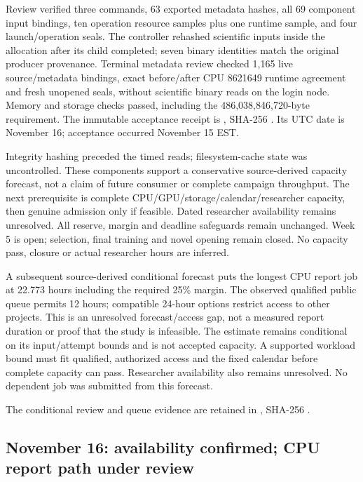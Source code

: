 Review verified three commands, 63 exported metadata hashes, all 69 component
input bindings, ten operation resource samples plus one runtime sample, and
four launch/operation seals. The controller rehashed scientific inputs inside
the allocation after its child completed; seven binary identities match the
original producer provenance. Terminal metadata review checked 1,165 live
source/metadata bindings, exact before/after CPU 8621649 runtime agreement and
fresh unopened seals, without scientific binary reads on the login node.
Memory and storage checks passed, including the 486,038,846,720-byte requirement.
The immutable acceptance receipt is
,
SHA-256
.
Its UTC date is November 16; acceptance occurred November 15 EST.

Integrity hashing preceded the timed reads; filesystem-cache state was
uncontrolled. These components support a conservative source-derived capacity
forecast, not a claim of future consumer or complete campaign throughput.
The next prerequisite is complete CPU/GPU/storage/calendar/researcher capacity,
then genuine admission only if feasible. Dated researcher availability remains
unresolved. All reserve, margin and deadline safeguards remain unchanged.
Week 5 is open; selection, final training and novel opening remain closed.
No capacity pass, closure or actual researcher hours are inferred.

A subsequent source-derived conditional forecast puts the longest CPU report
job at 22.773 hours including the required 25\% margin. The observed qualified
public queue permits 12 hours; compatible 24-hour options restrict access to
other projects. This is an unresolved forecast/access gap, not a measured
report duration or proof that the study is infeasible. The estimate remains
conditional on its input/attempt bounds and is not accepted capacity.
A supported workload bound must fit qualified, authorized access and the fixed
calendar before complete capacity can pass. Researcher availability also
remains unresolved. No dependent job was submitted from this forecast.

The conditional review and queue evidence are retained in
,
SHA-256
.

\subsection*{November 16: availability confirmed; CPU report path under review}

